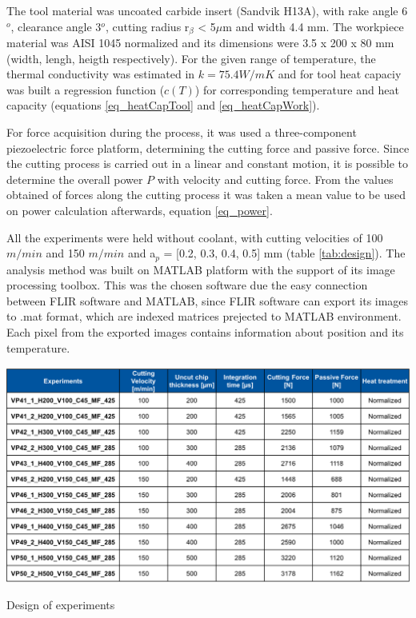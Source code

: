 	The tool material was uncoated carbide insert (Sandvik H13A), with rake angle 6$^{o}$, clearance angle 3$^{o}$, cutting radius r$_{\beta}$ < 5$\mu$m and width 4.4 mm. The workpiece material was AISI 1045 normalized and its dimensions were 3.5 x 200 x 80 mm (width, lengh, heigth respectively). For the given range of temperature, the thermal conductivity was estimated in $k = 75.4 W/mK$ and for tool heat capaciy was built a regression function ($c(T)$) for corresponding temperature and heat capacity (equations \ref{eq_heatCapTool} and \ref{eq_heatCapWork}).
	
	For force acquisition during the process, it was used a three-component piezoelectric force platform, determining the cutting force and passive force. Since the cutting process is carried out in a linear and constant motion, it is possible to determine the overall power $P$ with velocity and cutting force. From the values obtained of forces along the cutting process it was taken a mean value to be used on power calculation afterwards, equation \ref{eq_power}. 
	
	All the experiments were held without coolant, with cutting velocities of 100 $m/min$ and 150 $m/min$ and a$_{p}$ = [0.2, 0.3, 0.4, 0.5] mm (table \ref{tab:design}).
	The analysis method was built on MATLAB platform with the support of its image processing toolbox. This was the chosen software due the easy connection between FLIR software and MATLAB, since FLIR software can export its images to .mat format, which are indexed matrices prejected to MATLAB environment. Each pixel from the exported images contains information about position and its temperature.

	\begin{table}[H]
		\centering
		\captionsetup{justification=centering}
		\includegraphics[scale = 0.6]{Cap3/tabexpset.png}
		\caption{Design of experiments \cite{augspurger2016experimental}}
		\label{tab:design}
	\end{table}

